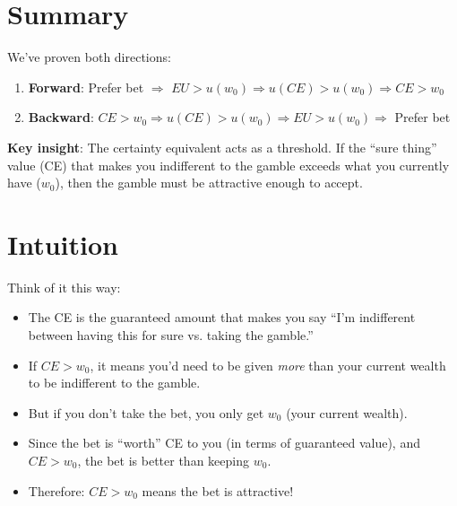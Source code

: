 \documentclass[12pt]{article}
\begin{document}
\newpage

\section*{Summary}

\begin{tcolorbox}[colback=green!5!white,colframe=green!75!black,title=The Complete Proof]
We've proven both directions:

\begin{enumerate}
    \item \textbf{Forward}: Prefer bet $\Rightarrow$ $EU > u(w_0) \Rightarrow u(CE) > u(w_0) \Rightarrow CE > w_0$

    \item \textbf{Backward}: $CE > w_0 \Rightarrow u(CE) > u(w_0) \Rightarrow EU > u(w_0) \Rightarrow$ Prefer bet
\end{enumerate}

\vspace{0.3cm}

\textbf{Key insight}: The certainty equivalent acts as a threshold. If the ``sure thing'' value (CE) that makes you indifferent to the gamble exceeds what you currently have ($w_0$), then the gamble must be attractive enough to accept.
\end{tcolorbox}

\section*{Intuition}

Think of it this way:

\begin{itemize}[leftmargin=*]
    \item The CE is the guaranteed amount that makes you say ``I'm indifferent between having this for sure vs. taking the gamble.''

    \item If $CE > w_0$, it means you'd need to be given \textit{more} than your current wealth to be indifferent to the gamble.

    \item But if you don't take the bet, you only get $w_0$ (your current wealth).

    \item Since the bet is ``worth'' CE to you (in terms of guaranteed value), and $CE > w_0$, the bet is better than keeping $w_0$.

    \item Therefore: $CE > w_0$ means the bet is attractive!
\end{itemize}
\end{document}
